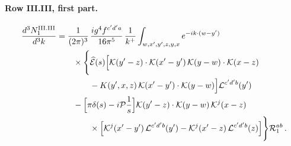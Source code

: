 \paragraph{Row III.III, first part.}
\begin{align}\label{eq:app_III31}
\frac{d^3N^{\rm III.III}_1}{d^3k}&=\frac{1}{(2\pi)^3}\,\frac{ig^4f^{c'd'a}}{16\pi^5}\,\frac{1}{k^+}\int_{w,x',y',z,y,x}e^{-ik\cdot(w-y')}\notag\\
&\qquad\times\Bigg\{\widehat{\mathcal E}(s)\Big[\mathcal{K}(y'-z)\cdot\mathcal{K}(x'-y')\,\mathcal{K}(y-w)\cdot\mathcal{K}(x-z)\notag\\&\qquad\qquad-K(y',x,z)\,\mathcal{K}(x'-y')\cdot\mathcal{K}(y-w)\Big]\mathcal L^{c'd'b}(y')\notag\\
&\qquad-\Big[\pi\delta(s)-i\mathcal P\frac1s\Big]\mathcal{K}(y'-z)\cdot\mathcal{K}(y-w)\,\mathcal{K}^j(x-z)\notag\\
&\qquad\qquad\times\Big[\mathcal{K}^j(x'-y')\,\mathcal L^{c'd'b}(y')-\mathcal{K}^j(x'-z)\,\mathcal L^{c'd'b}(z)\Big]\Bigg\}\mathcal R_1^{ab}\,.
\end{align}

